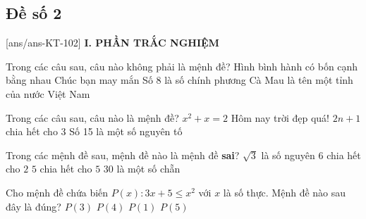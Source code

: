 \subsection*{Đề số 2}
\setcounter{ex}{0}\setcounter{bt}{0}
[ans/ans-KT-102]
\noindent\textbf{I. PHẦN TRẮC NGHIỆM}
\begin{ex}%
	Trong các câu sau, câu nào không phải là mệnh đề?
	\choice
	{Hình bình hành có bốn cạnh bằng nhau}
	{\True Chúc bạn may mắn}
	{Số $8$ là số chính phương}
	{Cà Mau là tên một tỉnh của nước Việt Nam}
\end{ex}
\begin{ex}%
	Trong các câu sau, câu nào là mệnh đề?
	\choice
	{$x^2+x=2$}
	{Hôm nay trời đẹp quá!}
	{$2n+1$ chia hết cho 3}
	{\True Số 15 là một số nguyên tố}
\end{ex}
\begin{ex}%
	Trong các mệnh đề sau, mệnh đề nào là mệnh đề \textbf{sai}?
	\choice
	{\True $\sqrt{3}$ là số nguyên}
	{$6$ chia hết cho $2$}
	{$5$ chia hết cho $5$}
	{$30$ là một số chẵn}
\end{ex}
\begin{ex}%
	Cho mệnh đề chứa biến $P(x): 3x+5\le x^2$ với $x$ là số thực. Mệnh đề nào sau đây là đúng?
	\choice
	{$P(3)$}
	{$P(4)$}
	{$P(1)$}
	{\True $P(5)$}
\end{ex}
